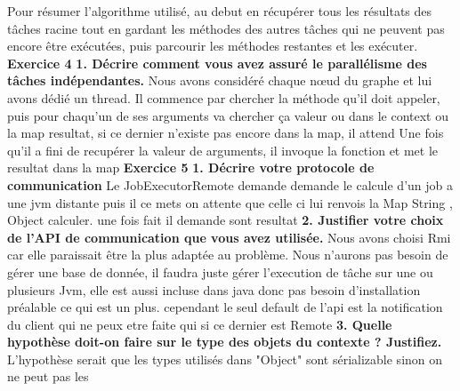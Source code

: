 \documentclass{article}
\begin{document}
Pour résumer l'algorithme utilisé, au debut en récupérer tous les résultats des tâches racine tout en gardant les méthodes 
des autres tâches qui ne peuvent pas encore être exécutées, puis parcourir les méthodes restantes et les exécuter.
\newline
\newline
\textbf{Exercice 4}
\newline
\newline
\textbf{1. Décrire comment vous avez assuré le parallélisme des tâches indépendantes.}
\newline
\newline
Nous avons considéré chaque nœud du graphe et lui avons dédié un thread. Il commence par chercher la 
méthode qu'il doit appeler, puis pour chaqu'un de ses arguments va chercher ça valeur ou dans le context ou la map resultat, si ce dernier n'existe pas encore dans la map, 
il attend Une fois qu'il a fini de recupérer la valeur de arguments, il invoque la fonction et met le resultat dans la map
\newline
\newline
\textbf{Exercice 5}
\newline
\newline
\textbf{1. Décrire votre protocole de communication}
\newline
\newline
Le JobExecutorRemote demande demande le calcule d'un job a une jvm distante puis il ce mets on attente
que celle ci lui renvois la Map String , Object  calculer.
une fois fait il demande sont resultat
\newline
\newline
\textbf{2. Justifier votre choix de l’API de communication que vous avez utilisée.}
\newline
\newline
Nous avons choisi Rmi car elle paraissait être la plus adaptée au problème. Nous n'aurons pas besoin de gérer une base de donnée,
il faudra juste gérer l'execution de tâche sur une ou plusieurs Jvm, elle est aussi incluse dans java donc pas besoin d'installation préalable ce qui est un plus.
cependant le seul default de l'api est la notification du client qui ne peux etre faite qui si ce dernier est Remote
\newline
\newline
\textbf{3. Quelle hypothèse doit-on faire sur le type des objets du contexte ? Justifiez.}
\newline
L'hypothèse serait que les types utilisés dans "Object" sont sérializable sinon on ne peut pas les 
\end{document}
